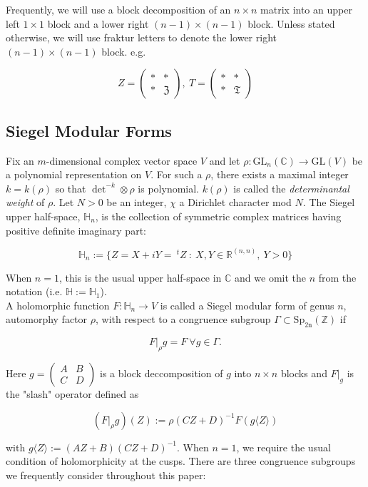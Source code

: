 \documentclass[11pt]{article}
\theoremstyle{definition}
\theoremstyle{remark}
\newcommand{\R}{\mathbb{R}}
\newcommand{\C}{\mathbb{C}}
\newcommand{\Z}{\mathbb{Z}}
\newcommand{\h}{\mathbb{H}}
\newcommand{\GL}{\text{GL}}
\begin{document}
Frequently, we will use a block decomposition of an $n \times n$ matrix into an upper left $1 \times 1$ block and a lower right $(n-1) \times (n-1)$ block. Unless stated otherwise, we will use fraktur letters to denote the lower right $(n-1) \times (n-1)$ block. e.g.

\[
Z = \begin{pmatrix}
    \ast & \ast \\ \ast & \mathfrak{Z}
\end{pmatrix}, \ T = \begin{pmatrix}
    * & * \\ * & \mathfrak{T}
\end{pmatrix}
\]


\subsection{Siegel Modular Forms}

Fix an $m$-dimensional complex vector space $V$ and let $\rho:\GL_n(\C) \to \GL(V)$ be a polynomial representation on $V$. For such a $\rho$, there exists a maximal integer $k = k(\rho)$ so that $\det^{-k} \otimes \rho$ is polynomial. $k(\rho)$ is called the \textit{determinantal weight} of $\rho$. Let $N > 0$ be an integer, $\chi$ a Dirichlet character mod $N$. The Siegel upper half-space, $\h_n$, is the collection of symmetric complex matrices having positive definite imaginary part:

\[
\h_n := \{Z = X+iY = \ ^tZ \ : \ X,Y \in \R^{(n,n)}, \ Y > 0\}
\]

When $n = 1$, this is the usual upper half-space in $\C$ and we omit the $n$ from the notation (i.e. $\h := \h_1$). \\

A holomorphic function $F:\h_n \to V$ is called a Siegel modular form of genus $n$, automorphy factor $\rho$, with respect to a congruence subgroup $\Gamma \subset \mathrm{Sp_{2n}(\Z)}$ if

\[
F \vert_\rho g = F \ \forall g \in \Gamma.
\]

Here $g = \begin{pmatrix} A & B \\ C & D \end{pmatrix}$ is a block deccomposition of $g$ into $n \times n$ blocks and $F \vert_g$ is the "slash" operator defined as

\[
(F \vert_\rho g)(Z) := \rho(CZ+D)^{-1} F(g \langle Z \rangle)
\]

with $g \langle Z \rangle := (AZ+B)(CZ+D)^{-1}$. When $n = 1$, we require the usual condition of holomorphicity at the cusps. There are three congruence subgroups we frequently consider throughout this paper: 
\end{document}
